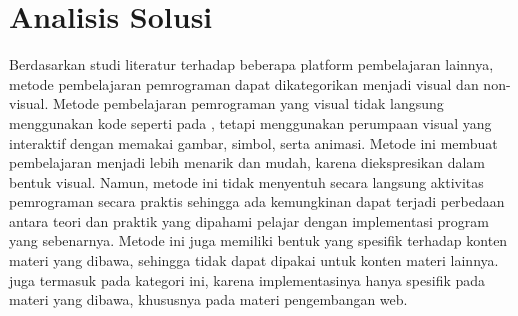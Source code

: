 


\section{Analisis Solusi}
Berdasarkan studi literatur terhadap beberapa platform pembelajaran lainnya, metode pembelajaran pemrograman dapat dikategorikan menjadi visual dan non-visual. Metode pembelajaran pemrograman yang visual tidak langsung menggunakan kode seperti pada \textcite{brilliant2021media}, tetapi menggunakan perumpaan visual yang interaktif dengan memakai gambar, simbol, serta animasi. Metode ini membuat pembelajaran menjadi lebih menarik dan mudah, karena diekspresikan dalam bentuk visual. Namun, metode ini tidak menyentuh secara langsung aktivitas pemrograman secara praktis sehingga ada kemungkinan dapat terjadi perbedaan antara teori dan praktik yang dipahami pelajar dengan implementasi program yang sebenarnya. Metode ini juga memiliki bentuk yang spesifik terhadap konten materi yang dibawa, sehingga tidak dapat dipakai untuk konten materi lainnya. \textcite{froggy2021media} juga termasuk pada kategori ini, karena implementasinya hanya spesifik pada materi yang dibawa, khususnya pada materi pengembangan web.

